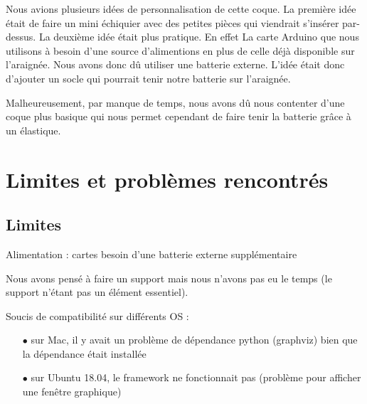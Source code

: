 Nous avions plusieurs idées de personnalisation de cette coque. La première idée était de faire un mini échiquier avec des petites pièces qui viendrait s’insérer par-dessus.  
La deuxième idée était plus pratique. En effet La carte Arduino que nous utilisons à besoin d’une source d’alimentions en plus de celle déjà disponible sur l’araignée. Nous avons donc dû utiliser une batterie externe. L’idée était donc d’ajouter un socle qui pourrait tenir notre batterie sur l’araignée. 
\linebreak

Malheureusement, par manque de temps, nous avons dû nous contenter d’une coque plus basique qui nous permet cependant de faire tenir la batterie grâce à un élastique. 


		\section{Limites et problèmes rencontrés}

			\subsection{Limites}

Alimentation : cartes besoin d'une batterie externe supplémentaire 

Nous avons pensé à faire un support mais nous n'avons pas eu le temps (le support n'étant pas un élément essentiel).

Soucis de compatibilité sur différents OS :  
\begin{itemize}
	\item[$\bullet$] sur Mac, il y avait un problème de dépendance python (graphviz) bien que la dépendance était installée
	\item[$\bullet$]sur Ubuntu 18.04, le framework ne fonctionnait pas (problème pour afficher une fenêtre graphique)
\end{itemize}

